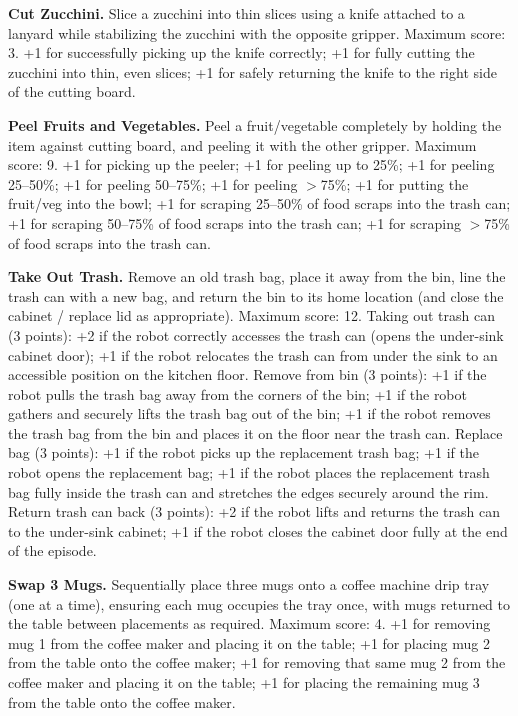 \documentclass[conference]{IEEEtran}
\begin{document}
\noindent \textbf{Cut Zucchini.} Slice a zucchini into thin slices using a knife attached to a lanyard while stabilizing the zucchini with the opposite gripper.
Maximum score: 3. +1 for successfully picking up the knife correctly; +1 for fully cutting the zucchini into thin, even slices; +1 for safely returning the knife to the right side of the cutting board.

\noindent \textbf{Peel Fruits and Vegetables.} Peel a fruit/vegetable completely by holding the item against cutting board, and peeling it with the other gripper.
Maximum score: 9. +1 for picking up the peeler; +1 for peeling up to 25\%; +1 for peeling 25–50\%; +1 for peeling 50–75\%; +1 for peeling $>$75\%; +1 for putting the fruit/veg into the bowl; +1 for scraping 25–50\% of food scraps into the trash can; +1 for scraping 50–75\% of food scraps into the trash can; +1 for scraping $>$75\% of food scraps into the trash can.

\noindent \textbf{Take Out Trash.} Remove an old trash bag, place it away from the bin, line the trash can with a new bag, and return the bin to its home location (and close the cabinet / replace lid as appropriate). Maximum score: 12. Taking out trash can (3 points): +2 if the robot correctly accesses the trash can (opens the under-sink cabinet door); +1 if the robot relocates the trash can from under the sink to an accessible position on the kitchen floor. Remove from bin (3 points): +1 if the robot pulls the trash bag away from the corners of the bin; +1 if the robot gathers and securely lifts the trash bag out of the bin; +1 if the robot removes the trash bag from the bin and places it on the floor near the trash can. Replace bag (3 points): +1 if the robot picks up the replacement trash bag; +1 if the robot opens the replacement bag; +1 if the robot places the replacement trash bag fully inside the trash can and stretches the edges securely around the rim. Return trash can back (3 points): +2 if the robot lifts and returns the trash can to the under-sink cabinet; +1 if the robot closes the cabinet door fully at the end of the episode.


\noindent \textbf{Swap 3 Mugs.} Sequentially place three mugs onto a coffee machine drip tray (one at a time), ensuring each mug occupies the tray once, with mugs returned to the table between placements as required. Maximum score: 4. +1 for removing mug 1 from the coffee maker and placing it on the table; +1 for placing mug 2 from the table onto the coffee maker; +1 for removing that same mug 2 from the coffee maker and placing it on the table; +1 for placing the remaining mug 3 from the table onto the coffee maker.
\end{document}
